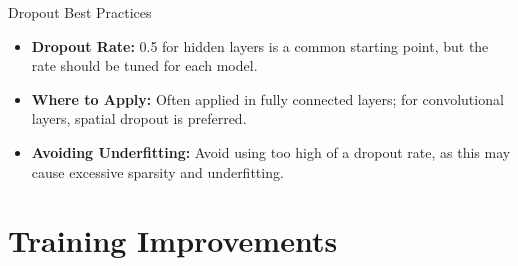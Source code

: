 \documentclass[serif, aspectratio=169]{beamer}
\begin{document}
\begin{frame}{Dropout Best Practices}
    \begin{itemize}
        \item \textbf{Dropout Rate:} 0.5 for hidden layers is a common starting point, but the rate should be tuned for each model.
        \item \textbf{Where to Apply:} Often applied in fully connected layers; for convolutional layers, spatial dropout is preferred.
        \item \textbf{Avoiding Underfitting:} Avoid using too high of a dropout rate, as this may cause excessive sparsity and underfitting.
    \end{itemize}
\end{frame}




\section{Training Improvements}



\end{document}
